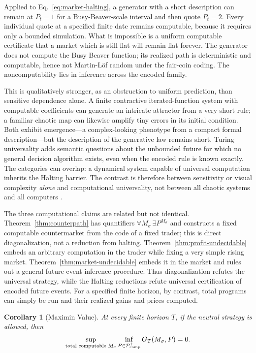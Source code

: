 \documentclass[aps,pra,reprint,superscriptaddress,amsmath,amssymb,floatfix]{revtex4-2}
\theoremstyle{plain}
\newtheorem{corollary}[theorem]{Corollary}
\theoremstyle{definition}
\theoremstyle{remark}
\begin{document}
Applied to Eq.~\eqref{eq:market-halting}, a generator with a short description
can remain at \(P_t=1\) for a Busy-Beaver-scale interval and then quote
\(P_t=2\). Every individual quote at a specified finite date remains
computable, because it requires only a bounded simulation. What is impossible
is a uniform computable certificate that a market which is still flat will
remain flat forever. The generator does not compute the Busy Beaver function;
its realized path is deterministic and computable, hence not Martin-L\"of
random under the fair-coin coding. The noncomputability lies in inference
across the encoded family.

This is qualitatively stronger, as an obstruction to uniform prediction, than
sensitive dependence alone. A finite contractive iterated-function system with
computable coefficients can generate an intricate attractor from a very short
rule; a familiar chaotic map can likewise amplify tiny errors in its initial
condition. Both exhibit emergence---a complex-looking phenotype from a compact
formal description---but the description of the generative law remains short.
Turing universality adds semantic questions about the unbounded future for
which no general decision algorithm exists, even when the encoded rule is
known exactly. The categories can overlap: a dynamical system capable of
universal computation inherits the Halting barrier. The contrast is therefore
between sensitivity or visual complexity \emph{alone} and computational
universality, not between all chaotic systems and all computers
\cite{barnsley:88,moore,calude:037103}.

The three computational claims are related but not identical.
Theorem~\ref{thm:counterpath} has quantifiers
\(\forall M_\sigma\,\exists P^{M_\sigma}\) and constructs a fixed computable
countermarket from the code of a fixed trader; this is direct diagonalization,
not a reduction from halting. Theorem~\ref{thm:profit-undecidable} embeds an
arbitrary computation in the trader while fixing a very simple rising market.
Theorem~\ref{thm:market-undecidable} embeds it in the market and rules out a
general future-event inference procedure. Thus diagonalization refutes the
universal strategy, while the Halting reductions refute universal
certification of encoded future events. For a specified finite horizon, by
contrast, total programs can simply be run and their realized gains and prices
computed.

\begin{corollary}[Maximin Value]
  \label{cor:maximin}
  At every finite horizon \(T\), if the neutral strategy is allowed, then
  \[
    \sup_{\text{\rm total computable }M_\sigma}
    \inf_{P\in\mathcal P_{\mathrm{comp}}^{+}}
    G_T(M_\sigma,P)=0.
  \]
\end{corollary}
\end{document}
